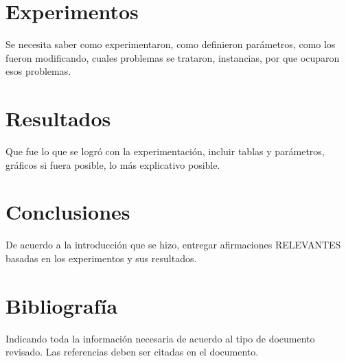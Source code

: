 \documentclass[letter, 10pt]{article}
\begin{document}
\section{Experimentos}
Se necesita saber como experimentaron, como definieron par\'ametros, como los fueron modificando, cuales 
problemas se trataron, instancias, por que ocuparon esos problemas.

\section{Resultados}
Que fue lo que se logr\'o con la experimentaci\'on, incluir tablas y par\'ametros, gr\'aficos si fuera
posible, lo m\'as explicativo posible.

\section{Conclusiones}
De acuerdo a la introducci\'on que se hizo, entregar afirmaciones RELEVANTES basadas en los experimentos
y sus resultados.

\section{Bibliograf\'ia} 
Indicando toda la informaci\'on necesaria de acuerdo al tipo de documento revisado. Las referencias deben ser citadas en el documento.


\end{document}
